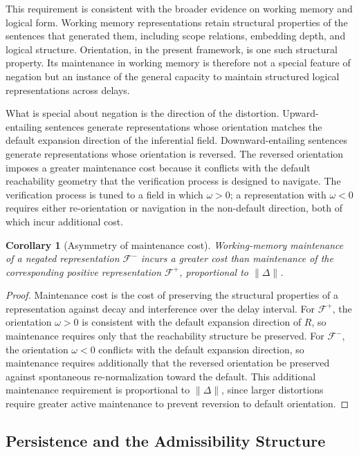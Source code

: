 \documentclass[12pt]{article}
\newtheorem{corollary}[theorem]{Corollary}
\theoremstyle{remark}
\begin{document}
This requirement is consistent with the broader evidence on working
memory and logical form. Working memory representations retain structural
properties of the sentences that generated them, including scope
relations, embedding depth, and logical structure. Orientation, in the
present framework, is one such structural property. Its maintenance in
working memory is therefore not a special feature of negation but an
instance of the general capacity to maintain structured logical
representations across delays.

What is special about negation is the direction of the distortion.
Upward-entailing sentences generate representations whose orientation
matches the default expansion direction of the inferential field.
Downward-entailing sentences generate representations whose orientation
is reversed. The reversed orientation imposes a greater maintenance cost
because it conflicts with the default reachability geometry that the
verification process is designed to navigate. The verification process
is tuned to a field in which $\omega > 0$; a representation with $\omega
< 0$ requires either re-orientation or navigation in the non-default
direction, both of which incur additional cost.

\begin{corollary}[Asymmetry of maintenance cost]
\label{cor:maintenance}
Working-memory maintenance of a negated representation $\mathcal{F}^-$
incurs a greater cost than maintenance of the corresponding positive
representation $\mathcal{F}^+$, proportional to $\|\Delta\|$.
\end{corollary}

\begin{proof}
Maintenance cost is the cost of preserving the structural properties of
a representation against decay and interference over the delay interval.
For $\mathcal{F}^+$, the orientation $\omega > 0$ is consistent with
the default expansion direction of $R$, so maintenance requires only
that the reachability structure be preserved. For $\mathcal{F}^-$, the
orientation $\omega < 0$ conflicts with the default expansion direction,
so maintenance requires additionally that the reversed orientation be
preserved against spontaneous re-normalization toward the default. This
additional maintenance requirement is proportional to $\|\Delta\|$,
since larger distortions require greater active maintenance to prevent
reversion to default orientation.
\end{proof}

\subsection{Persistence and the Admissibility Structure}
\end{document}
